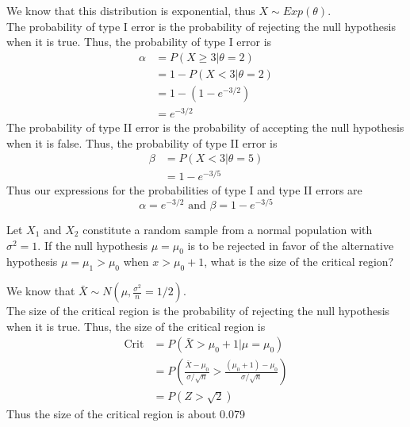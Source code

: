 \documentclass[answers,12pt,addpoints]{exam}
\begin{document}
\begin{questions}
    \begin{solution}
        We know that this distribution is exponential, thus $X \sim Exp(\theta)$. \\
        The probability of type I error is the probability of rejecting the null hypothesis when it is true. Thus, the probability of type I error is
        \begin{align*}
            \alpha &= P(X \geq 3 | \theta = 2) \\
            &= 1 - P(X < 3 | \theta = 2) \\
            &= 1 - (1 - e^{-3/2}) \\
            &= e^{-3/2}
        \end{align*}
        The probability of type II error is the probability of accepting the null hypothesis when it is false. Thus, the probability of type II error is
        \begin{align*}
            \beta &= P(X < 3 | \theta = 5) \\
            &=  1 - e^{-3/5}
        \end{align*}
        Thus our expressions for the probabilities of type I and type II errors are
        \[\alpha = e^{-3/2} \text{ and } \beta = 1 - e^{-3/5}\]
    \end{solution}

    Let \(X_1\) and \(X_2\) constitute a random sample from a normal population with \(\sigma^2 = 1\). If the null hypothesis \(\mu = \mu_0\) is to be rejected in favor of the alternative hypothesis \(\mu = \mu_1 > \mu_0\) when \(x > \mu_0 + 1\), what is the size of the critical region?

    \begin{solution}
        We know that $\bar{X} \sim N(\mu, \frac{\sigma^2}{n} = 1/2)$. \\
        The size of the critical region is the probability of rejecting the null hypothesis when it is true. Thus, the size of the critical region is
        \begin{align*}
            \text{Crit} &= P(\bar{X} > \mu_0 + 1 | \mu = \mu_0) \\
            &= P\left(\frac{\bar{X} - \mu_0}{\sigma/\sqrt{n}} > \frac{(\mu_0 + 1) - \mu_0}{\sigma/ \sqrt{n}}\right)\\
            &= P(Z > \sqrt{2})
        \end{align*}
        Thus the size of the critical region is about 0.079
    \end{solution}



\end{questions}
\end{document}
